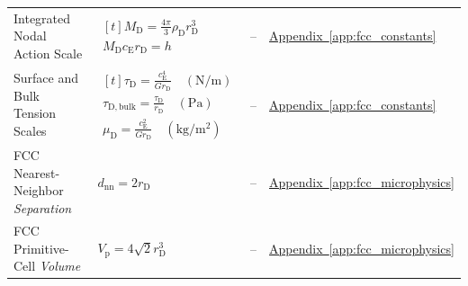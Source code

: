 \begin{longtable}{@{} p{4.5cm} p{6cm} c p{4cm} @{}}
{\raggedright Integrated Nodal Action Scale\par} & {\raggedright $\begin{gathered}[t]M_{\mathrm D}=\frac{4\pi}{3}\rho_{\mathrm D}r_{\mathrm D}^3 \\ M_{\mathrm D}c_{\mathrm E}r_{\mathrm D}=h\end{gathered}$\par} & -- & {\raggedright \hyperref[app:fcc_constants]{Appendix~\ref*{app:fcc_constants}}\par} \\

{\raggedright Surface and Bulk Tension Scales\par} & {\raggedright $\begin{gathered}[t]\tau_{\mathrm D}=\frac{c_{\mathrm E}^4}{Gr_{\mathrm D}}\quad(\mathrm{N/m}) \\ \tau_{\mathrm{D,bulk}}=\frac{\tau_{\mathrm D}}{r_{\mathrm D}}\quad(\mathrm{Pa}) \\ \mu_{\mathrm D}=\frac{c_{\mathrm E}^2}{Gr_{\mathrm D}}\quad(\mathrm{kg/m^2})\end{gathered}$\par} & -- & {\raggedright \hyperref[app:fcc_constants]{Appendix~\ref*{app:fcc_constants}}\par} \\

{\raggedright FCC Nearest-Neighbor \newline \textit{Separation}\par} & {\raggedright $d_{\mathrm{nn}} = 2r_{\mathrm{D}}$\par} & -- & {\raggedright \hyperref[app:fcc_microphysics]{Appendix~\ref*{app:fcc_microphysics}}\par} \\

{\raggedright FCC Primitive-Cell \newline \textit{Volume}\par} & {\raggedright $V_{\mathrm{p}} = 4\sqrt{2} r_{\mathrm{D}}^3$\par} & -- & {\raggedright \hyperref[app:fcc_microphysics]{Appendix~\ref*{app:fcc_microphysics}}\par} \\


\end{longtable}
